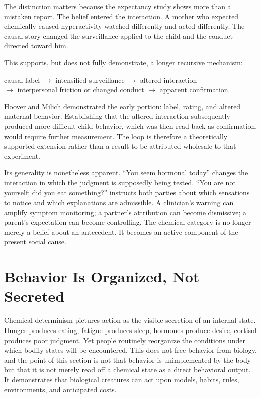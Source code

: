 \documentclass[11pt]{article}
\begin{document}
The distinction matters because the expectancy study shows more than a mistaken report. The belief entered the interaction. A mother who expected chemically caused hyperactivity watched differently and acted differently. The causal story changed the surveillance applied to the child and the conduct directed toward him.

This supports, but does not fully demonstrate, a longer recursive mechanism:

\begin{center}
causal label $\rightarrow$ intensified surveillance $\rightarrow$ altered interaction\\
$\rightarrow$ interpersonal friction or changed conduct $\rightarrow$ apparent confirmation.
\end{center}

Hoover and Milich demonstrated the early portion: label, rating, and altered maternal behavior. Establishing that the altered interaction subsequently produced more difficult child behavior, which was then read back as confirmation, would require further measurement. The loop is therefore a theoretically supported extension rather than a result to be attributed wholesale to that experiment.

Its generality is nonetheless apparent. ``You seem hormonal today'' changes the interaction in which the judgment is supposedly being tested. ``You are not yourself; did you eat something?'' instructs both parties about which sensations to notice and which explanations are admissible. A clinician's warning can amplify symptom monitoring; a partner's attribution can become dismissive; a parent's expectation can become controlling. The chemical category is no longer merely a belief about an antecedent. It becomes an active component of the present social cause.

\section{Behavior Is Organized, Not Secreted}

Chemical determinism pictures action as the visible secretion of an internal state. Hunger produces eating, fatigue produces sleep, hormones produce desire, cortisol produces poor judgment. Yet people routinely reorganize the conditions under which bodily states will be encountered. This does not free behavior from biology, and the point of this section is not that behavior is unimplemented by the body but that it is not merely read off a chemical state as a direct behavioral output. It demonstrates that biological creatures can act upon models, habits, rules, environments, and anticipated costs.
\end{document}
